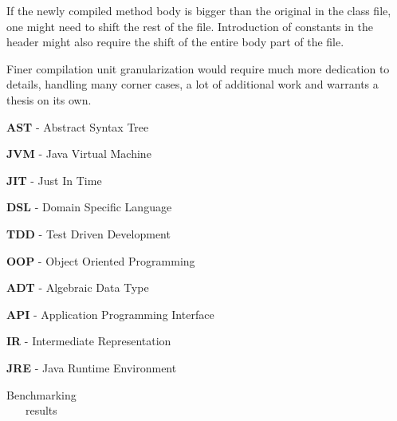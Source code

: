 \documentclass{VUMIFPSbakalaurinis}
\begin{document}
If the newly compiled method body is bigger than the original in the class file, one might need to shift the rest of the file.
Introduction of constants in the header might also require the shift of the entire body part of the file.

Finer compilation unit granularization would require much more dedication to details, handling many corner cases, a lot of additional work and warrants a thesis on its own.
\fi



\textbf{AST} - Abstract Syntax Tree

\textbf{JVM} - Java Virtual Machine

\textbf{JIT} - Just In Time

\textbf{DSL} - Domain Specific Language

\textbf{TDD} - Test Driven Development

\textbf{OOP} - Object Oriented Programming

\textbf{ADT} - Algebraic Data Type

\textbf{API} - Application Programming Interface

\textbf{IR} - Intermediate Representation

\textbf{JRE} - Java Runtime Environment

\appendix  %


\begin{center}
	\begin{table}
	  \caption{Benchmarking results}
	  \label{tb:benchmarks}

    \begin{tabular}{ c | c || c || c | c | c || c | c | c | c | c | c }
      
    \end{tabular}
  \end{table}
\end{center}

\printbibliography[heading=bibintoc]
\end{document}
